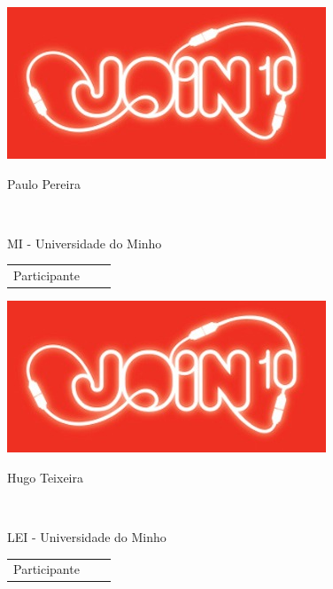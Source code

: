 \documentclass[twocolumn]{article}
\begin{document}
  
 \vspace{13mm} 
 \begin{minipage}{89mm} 
 \includegraphics{design/logo}\\ 
 
 \addvspace{5mm} 
 
 \begin{center} 
 \huge{Paulo Pereira} 
 \scriptsize{ 
 \begin{tabular*}{0.75\textwidth}{c} 
 \hline 
 \end{tabular*}}\\ 
MI - Universidade do Minho
 \end{center} 
 
 \begin{flushright} 
 \begin{tabular}{r l l} 
 \normalsize{Participante} & & 
 \end{tabular} 
 \end{flushright} 
 \end{minipage} 
 
  
 \vspace{13mm} 
 \begin{minipage}{89mm} 
 \includegraphics{design/logo}\\ 
 
 \addvspace{5mm} 
 
 \begin{center} 
 \huge{Hugo Teixeira} 
 \scriptsize{ 
 \begin{tabular*}{0.75\textwidth}{c} 
 \hline 
 \end{tabular*}}\\ 
LEI - Universidade do Minho
 \end{center} 
 
 \begin{flushright} 
 \begin{tabular}{r l l} 
 \normalsize{Participante} & & 
 \end{tabular} 
 \end{flushright} 
 \end{minipage} 
 
\end{document}
